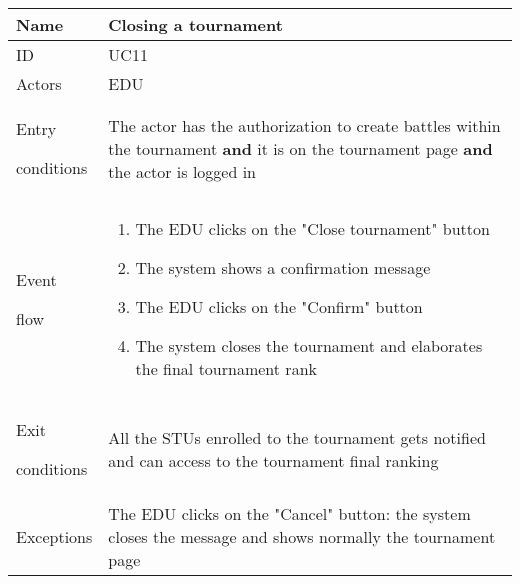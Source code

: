 \begin{center}
    \def\arraystretch{1.5}
    \begin{tabular}{| m{2cm} | m{10cm}|}
        \hline
        Name                  & Closing a tournament                                                                                                                                  \\ \hline
        ID                    & UC11                                                                                                                                                  \\ \hline
        Actors                & EDU                                                                                                                                                   \\ \hline
        Entry \par conditions & The actor has the authorization to create battles within the tournament \textbf{and} it is on the tournament page \textbf{and} the actor is logged in \\ \hline
        Event \par flow       & \begin{enumerate}
                                    \item The EDU clicks on the "Close tournament" button
                                    \item The system shows a confirmation message
                                    \item The EDU clicks on the "Confirm" button
                                    \item The system closes the tournament and elaborates the final tournament rank
                                \end{enumerate}                                                                        \\ \hline
        Exit \par conditions  & All the STUs enrolled to the tournament gets notified and can access to the tournament final ranking                                                  \\ \hline
        Exceptions            & The EDU clicks on the "Cancel" button: the system closes the message and shows normally the tournament page                                           \\ \hline
    \end{tabular}
\end{center}

